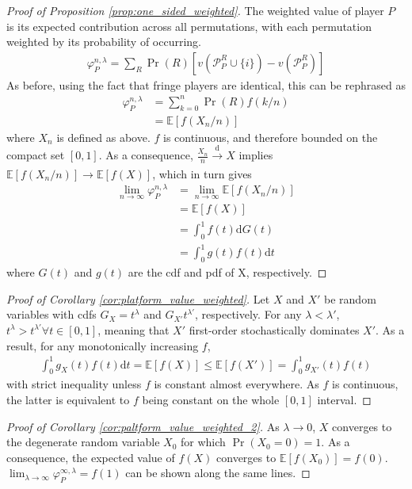 \documentclass[a4paper]{article}
\newcommand{\dt}{\mathrm{d}t}
\newcommand{\E}{\mathbb{E}}
\begin{document}
\begin{proof}[Proof of Proposition \ref{prop:one_sided_weighted}]
    The weighted value of player $P$ is its expected contribution across all permutations, with each permutation weighted by its probability of occurring.
    \begin{align*}
        \varphi_P^{n, \lambda} = \sum_R \Pr(R) [v(\mathcal{P}_P^R \cup \{i\}) - v(\mathcal{P}_P^R)]
    \end{align*}
    As before, using the fact that fringe players are identical, this can be rephrased as
    \begin{align*}
        \varphi_P^{n, \lambda} &= \sum_{k=0}^n \Pr(R) f(k/n) \\
        &= \E[f(X_n / n)]
    \end{align*}
    where $X_n$ is defined as above.
    $f$ is continuous, and therefore bounded on the compact set $[0, 1]$.
    As a consequence, $\frac{X_n}{n} \xrightarrow[]{\mathrm{d}} X$ implies $\E[f(X_n / n)] \to \E[f(X)]$, which in turn gives
    \begin{align*}
        \lim_{n \to \infty} \varphi_P^{n, \lambda} &= \lim_{n \to \infty} \E[f(X_n / n)] \\
        &= \E[f(X)] \\
        &= \int_0^1 f(t) \mathrm{d}G(t) \\
        &= \int_0^1 g(t)f(t) \dt
    \end{align*}
    where $G(t)$ and $g(t)$ are the cdf and pdf of X, respectively.
\end{proof}

\begin{proof}[Proof of Corollary \ref{cor:platform_value_weighted}]
    Let $X$ and $X'$ be random variables with cdfs $G_X = t^\lambda$ and $G_{X'}t^{\lambda'}$, respectively.
    For any $\lambda < \lambda'$, $t^\lambda > t^{\lambda'} \forall t \in [0, 1]$, meaning that $X'$ first-order stochastically dominates $X'$.
    As a result, for any monotonically increasing $f$,
    \begin{align*}
        \int_0^1 g_X(t)f(t) \dt = \E[f(X)] \leq \E[f(X')] = \int_0^1 g_{X'}(t)f(t)
    \end{align*}
    with strict inequality unless $f$ is constant almost everywhere.
    As $f$ is continuous, the latter is equivalent to $f$ being constant on the whole $[0, 1]$ interval.
\end{proof}

\begin{proof}[Proof of Corollary \ref{cor:paltform_value_weighted_2}]
    As $\lambda \to 0$, $X$ converges to the degenerate random variable $X_0$ for which $\Pr(X_0 = 0) = 1$.
    As a consequence, the expected value of $f(X)$ converges to $\E[f(X_0)] = f(0)$.
    $\lim_{\lambda \to \infty} \varphi^{\infty, \lambda}_P = f(1)$ can be shown along the same lines.
\end{proof}
\end{document}
